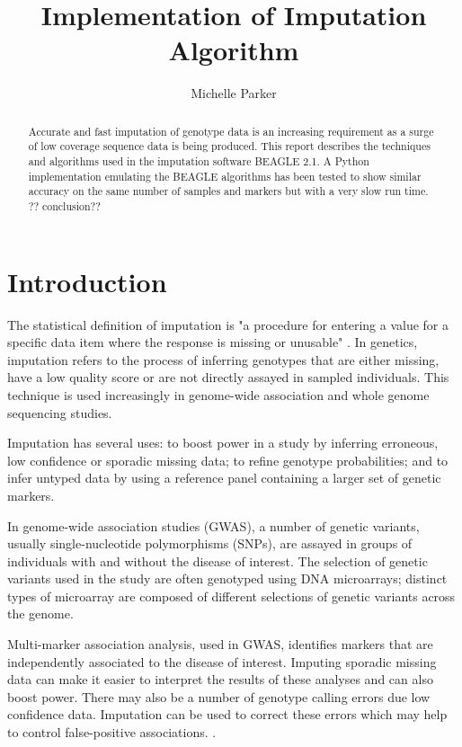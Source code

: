 \documentclass[a4paper,11pt,twoside,abstraction,titlepage]{article}
\title{\Large \bf Implementation of Imputation Algorithm}
\author{Michelle Parker}
\begin{document}
\maketitle

\begin{abstract}
Accurate and fast imputation of genotype data is an increasing requirement as a surge of low coverage sequence data is being produced.  This report describes the techniques and algorithms used in the imputation software BEAGLE 2.1.  A Python implementation emulating the BEAGLE algorithms has been tested to show similar accuracy on the same number of samples and markers but with a very slow run time.  ?? conclusion??
\end{abstract}

\clearpage
\setcounter{tocdepth}{2}
\tableofcontents

 
\newpage

\section{Introduction}
The statistical definition of imputation is "a procedure for entering a value for a specific data item where the response is missing or unusable" \cite{unece}. In genetics, imputation refers to the process of inferring genotypes that are either missing, have a low quality score or are not directly assayed in sampled individuals.  This technique is used increasingly in genome-wide association and whole genome sequencing studies. 

Imputation has several uses: to boost power in a study by inferring erroneous, low confidence or sporadic missing data; to refine genotype probabilities; and to infer untyped data by using a reference panel containing a larger set of genetic markers.

In genome-wide association studies (GWAS), a number of genetic variants, usually single-nucleotide polymorphisms (SNPs), are assayed in groups of individuals with and without the disease of interest.  The selection of genetic variants used in the study are often genotyped using DNA microarrays; distinct types of microarray are composed of different selections of genetic variants across the genome.

Multi-marker association analysis, used in GWAS, identifies markers that are independently associated to the disease of interest.  Imputing sporadic missing data can make it easier to interpret the results of these analyses and can also boost power.  There may also be a number of genotype calling errors due low confidence data.  Imputation can be used to correct these errors which may help to control false-positive associations. \cite{review2009}.
\end{document}

